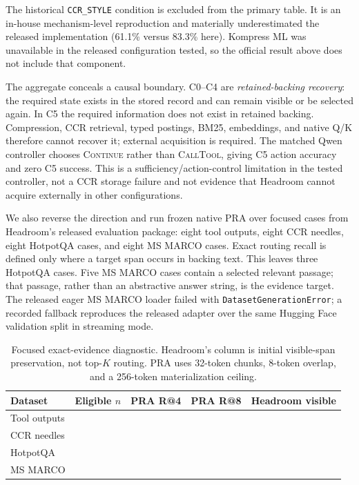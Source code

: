 \documentclass[11pt]{article}
\begin{document}
The historical \texttt{CCR\_STYLE} condition is excluded from the primary
table. It is an in-house mechanism-level reproduction and materially
underestimated the released implementation (61.1\% versus 83.3\% here).
Kompress ML was unavailable in the released configuration tested, so the
official result above does not include that component.

The aggregate conceals a causal boundary. C0--C4 are
\emph{retained-backing recovery}: the required state exists in the stored
record and can remain visible or be selected again. In C5 the required
information does not exist in retained backing. Compression, CCR retrieval,
typed postings, BM25, embeddings, and native Q/K therefore cannot recover it;
external acquisition is required. The matched Qwen controller chooses
\textsc{Continue} rather than \textsc{CallTool}, giving
\PaperSevenHeadroomCfiveTrigger{} C5 action accuracy and zero C5 success. This
is a sufficiency/action-control limitation in the tested controller, not a CCR
storage failure and not evidence that Headroom cannot acquire externally in
other configurations.

We also reverse the direction and run frozen native PRA over focused cases
from Headroom's released evaluation package: eight tool outputs, eight CCR
needles, eight HotpotQA cases, and eight MS MARCO cases. Exact routing recall is
defined only where a target span occurs in backing text. This leaves three
HotpotQA cases. Five MS MARCO cases contain a selected relevant passage; that
passage, rather than an abstractive answer string, is the evidence target. The
released eager MS MARCO loader failed with \texttt{DatasetGenerationError}; a
recorded fallback reproduces the released adapter over the same Hugging Face
validation split in streaming mode.

\begin{table}[H]
\centering
\small
\begin{tabular}{@{}lrrrr@{}}
\toprule
Dataset & Eligible $n$ & PRA R@4 & PRA R@8 & Headroom visible\\
\midrule
Tool outputs & \PaperSevenCrossTooloutputsPRAN{} & \PaperSevenCrossTooloutputsPRA{} & \PaperSevenCrossTooloutputsPRAREight{} & \PaperSevenCrossTooloutputsHeadroom{}\\
CCR needles & \PaperSevenCrossCcrneedlePRAN{} & \PaperSevenCrossCcrneedlePRA{} & \PaperSevenCrossCcrneedlePRAREight{} & \PaperSevenCrossCcrneedleHeadroom{}\\
HotpotQA & \PaperSevenCrossHotpotqaPRAN{} & \PaperSevenCrossHotpotqaPRA{} & \PaperSevenCrossHotpotqaPRAREight{} & \PaperSevenCrossHotpotqaHeadroom{}\\
MS MARCO & \PaperSevenCrossMsmarcoPRAN{} & \PaperSevenCrossMsmarcoPRA{} & \PaperSevenCrossMsmarcoPRAREight{} & \PaperSevenCrossMsmarcoHeadroom{}\\
\bottomrule
\end{tabular}
\caption{Focused exact-evidence diagnostic. Headroom's column is initial
visible-span preservation, not top-$K$ routing. PRA uses 32-token chunks,
8-token overlap, and a 256-token materialization ceiling.}
\label{tab:pra-on-headroom}
\end{table}
\end{document}
